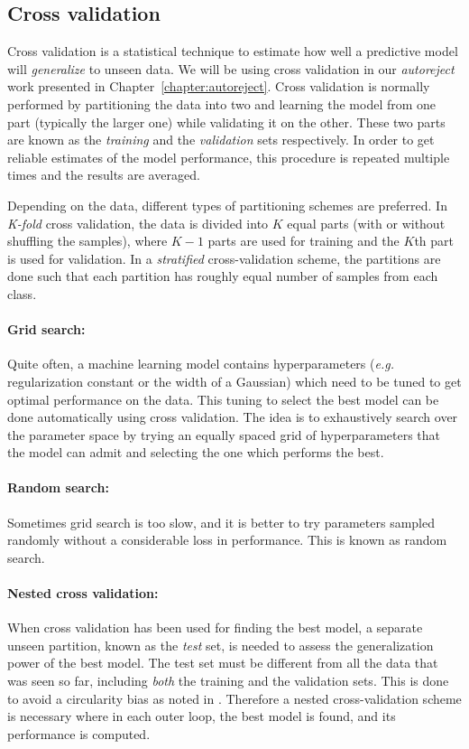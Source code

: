 \subsection{Cross validation}

Cross validation is a statistical technique to estimate how well a predictive model will \emph{generalize} to unseen data. We will be using cross validation in our \emph{autoreject} work presented in Chapter~\ref{chapter:autoreject}. Cross validation is normally performed by partitioning the data into two and learning the model from one part (typically the larger one) while validating it on the other. These two parts are known as the \emph{training} and the \emph{validation} sets respectively. In order to get reliable estimates of the model performance, this procedure is repeated multiple times and the results are averaged.

Depending on the data, different types of partitioning schemes are preferred. In \emph{K-fold} cross validation, the data is divided into $K$ equal parts (with or without shuffling the samples), where $K - 1$ parts are used for training and the $K$th part is used for validation. In a \emph{stratified} cross-validation scheme, the partitions are done such that each partition has roughly equal number of samples from each class.

\paragraph{Grid search: } Quite often, a machine learning model contains hyperparameters (\textit{e.g.} regularization constant or the width of a Gaussian) which need to be tuned to get optimal performance on the data. This tuning to select the best model can be done automatically using cross validation. The idea is to exhaustively search over the parameter space by trying an equally spaced grid of hyperparameters that the model can admit and selecting the one which performs the best.

\paragraph{Random search: } Sometimes grid search is too slow, and it is better to try parameters sampled randomly without a considerable loss in performance. This is known as random search.

\paragraph{Nested cross validation: } When cross validation has been used for finding the best model, a separate unseen partition, known as the \emph{test} set, is needed to assess the generalization power of the best model. The test set must be different from all the data that was seen so far, including \emph{both} the training and the validation sets. This is done to avoid a circularity bias as noted in \citet{varoquaux2017assessing, cawley2010over,friedman2001elements}.
Therefore a nested cross-validation scheme is necessary where in each outer loop, the best model is found, and its performance is computed.

